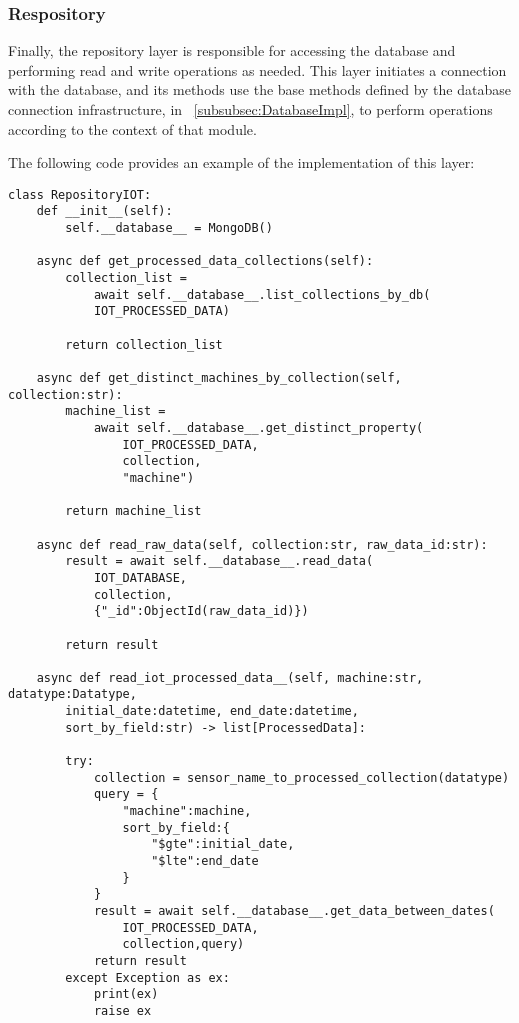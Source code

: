 \subsubsection{Respository}\label{subsubsec:repository}
Finally, the repository layer is responsible for accessing the database and performing read and write operations as needed. This layer initiates a connection with the database, and its methods use the base methods defined by the database connection infrastructure, in ~\ref{subsubsec:DatabaseImpl}, to perform operations according to the context of that module.

The following code provides an example of the implementation of this layer:

\begin{verbatim}
class RepositoryIOT:
    def __init__(self):
        self.__database__ = MongoDB()
    
    async def get_processed_data_collections(self):
        collection_list = 
            await self.__database__.list_collections_by_db(
            IOT_PROCESSED_DATA)
    
        return collection_list
        
    async def get_distinct_machines_by_collection(self, collection:str):
        machine_list = 
            await self.__database__.get_distinct_property(
                IOT_PROCESSED_DATA,
                collection,
                "machine")

        return machine_list
    
    async def read_raw_data(self, collection:str, raw_data_id:str):
        result = await self.__database__.read_data(
            IOT_DATABASE,
            collection,
            {"_id":ObjectId(raw_data_id)})

        return result
    
    async def read_iot_processed_data__(self, machine:str, datatype:Datatype, 
        initial_date:datetime, end_date:datetime, 
        sort_by_field:str) -> list[ProcessedData]:
        
        try:
            collection = sensor_name_to_processed_collection(datatype)
            query = {
                "machine":machine,
                sort_by_field:{
                    "$gte":initial_date,
                    "$lte":end_date
                }
            }
            result = await self.__database__.get_data_between_dates(
                IOT_PROCESSED_DATA,
                collection,query)
            return result
        except Exception as ex:
            print(ex)
            raise ex
\end{verbatim}

